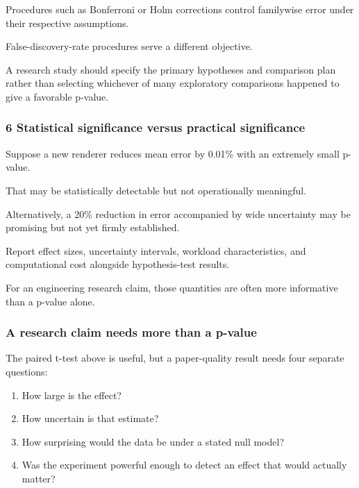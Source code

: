 Procedures such as Bonferroni or Holm corrections control familywise error under their respective assumptions.

False-discovery-rate procedures serve a different objective.

A research study should specify the primary hypotheses and comparison plan rather than selecting whichever of many exploratory comparisons happened to give a favorable p-value.

\subsubsection{6 Statistical significance versus practical significance}\label{02-foundations-ii-ch030-statistical-significance-versus-practical-significance}

Suppose a new renderer reduces mean error by 0.01\% with an extremely small p-value.

That may be statistically detectable but not operationally meaningful.

Alternatively, a 20\% reduction in error accompanied by wide uncertainty may be promising but not yet firmly established.

Report effect sizes, uncertainty intervals, workload characteristics, and computational cost alongside hypothesis-test results.

For an engineering research claim, those quantities are often more informative than a p-value alone.

\subsubsection{A research claim needs more than a p-value}\label{02-foundations-ii-ch030-a-research-claim-needs-more-than-a-p-value}

The paired t-test above is useful, but a paper-quality result needs four separate questions:

\begin{enumerate}
\def\labelenumi{\arabic{enumi}.}
\tightlist
\item
  How large is the effect?
\item
  How uncertain is that estimate?
\item
  How surprising would the data be under a stated null model?
\item
  Was the experiment powerful enough to detect an effect that would actually matter?
\end{enumerate}

